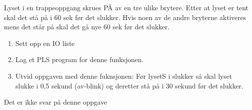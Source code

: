 


Lyset i en trappeoppgang skrues PÅ av en tre ulike brytere. Etter
at lyset er tent skal det stå på i 60 sek før det slukker. Hvis noen
av de andre bryterne aktiveres mens det står på skal det gå nye 60
sek før det slukker.
\begin{enumerate}
\item Sett opp en IO liste
\item Lag et PLS program for denne funksjonen.
\item Utvid oppgaven med denne fuknsjonen: Før lysetS i slukker så skal
lyset slukke i 0,5 sekund (av-blink) og deretter stå på i 30 sekund
før det slukker.
\end{enumerate}






Det er ikke svar på denne oppgave












